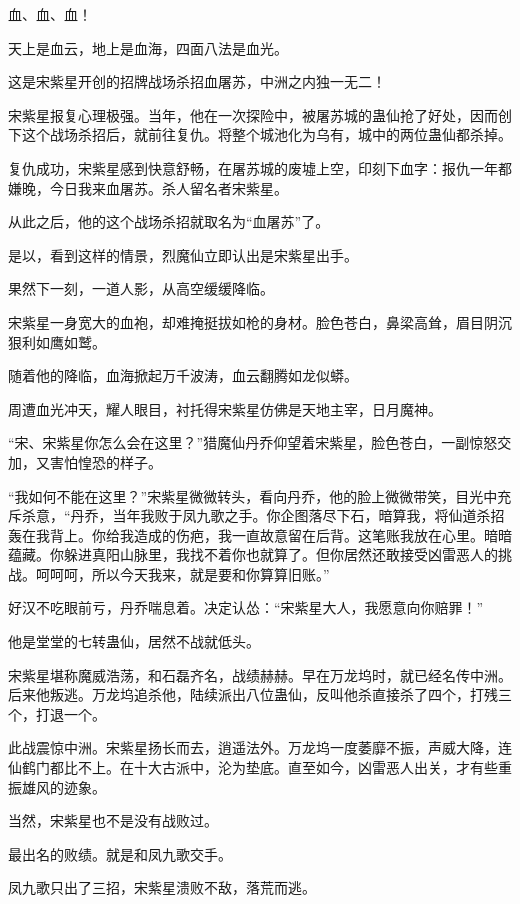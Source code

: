 
\begin{this_body}

血、血、血！

天上是血云，地上是血海，四面八法是血光。

这是宋紫星开创的招牌战场杀招血屠苏，中洲之内独一无二！

宋紫星报复心理极强。当年，他在一次探险中，被屠苏城的蛊仙抢了好处，因而创下这个战场杀招后，就前往复仇。将整个城池化为乌有，城中的两位蛊仙都杀掉。

复仇成功，宋紫星感到快意舒畅，在屠苏城的废墟上空，印刻下血字：报仇一年都嫌晚，今日我来血屠苏。杀人留名者宋紫星。

从此之后，他的这个战场杀招就取名为“血屠苏”了。

是以，看到这样的情景，烈魔仙立即认出是宋紫星出手。

果然下一刻，一道人影，从高空缓缓降临。

宋紫星一身宽大的血袍，却难掩挺拔如枪的身材。脸色苍白，鼻梁高耸，眉目阴沉狠利如鹰如鹫。

随着他的降临，血海掀起万千波涛，血云翻腾如龙似蟒。

周遭血光冲天，耀人眼目，衬托得宋紫星仿佛是天地主宰，日月魔神。

“宋、宋紫星你怎么会在这里？”猎魔仙丹乔仰望着宋紫星，脸色苍白，一副惊怒交加，又害怕惶恐的样子。

“我如何不能在这里？”宋紫星微微转头，看向丹乔，他的脸上微微带笑，目光中充斥杀意，“丹乔，当年我败于凤九歌之手。你企图落尽下石，暗算我，将仙道杀招轰在我背上。你给我造成的伤疤，我一直故意留在后背。这笔账我放在心里。暗暗蕴藏。你躲进真阳山脉里，我找不着你也就算了。但你居然还敢接受凶雷恶人的挑战。呵呵呵，所以今天我来，就是要和你算算旧账。”

好汉不吃眼前亏，丹乔喘息着。决定认怂：“宋紫星大人，我愿意向你赔罪！”

他是堂堂的七转蛊仙，居然不战就低头。

宋紫星堪称魔威浩荡，和石磊齐名，战绩赫赫。早在万龙坞时，就已经名传中洲。后来他叛逃。万龙坞追杀他，陆续派出八位蛊仙，反叫他杀直接杀了四个，打残三个，打退一个。

此战震惊中洲。宋紫星扬长而去，逍遥法外。万龙坞一度萎靡不振，声威大降，连仙鹤门都比不上。在十大古派中，沦为垫底。直至如今，凶雷恶人出关，才有些重振雄风的迹象。

当然，宋紫星也不是没有战败过。

最出名的败绩。就是和凤九歌交手。

凤九歌只出了三招，宋紫星溃败不敌，落荒而逃。


\end{this_body}

